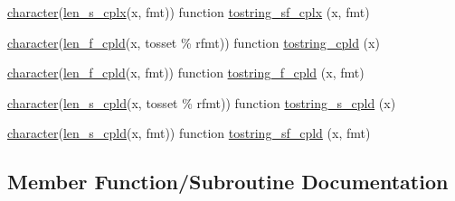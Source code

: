 \begin{DoxyCompactItemize}
\item 
\hyperlink{option__stopwatch_83_8txt_abd4b21fbbd175834027b5224bfe97e66}{character}(\hyperlink{namespacem__display_a7b573fb0cba7c7c954a820cdfe1c7968}{len\+\_\+s\+\_\+cplx}(x, fmt)) function \hyperlink{interfacem__display_1_1tostring_ac01ed8027512191049535c16d79cecc7}{tostring\+\_\+sf\+\_\+cplx} (x, fmt)
\item 
\hyperlink{option__stopwatch_83_8txt_abd4b21fbbd175834027b5224bfe97e66}{character}(\hyperlink{namespacem__display_a803611d2a793f2a4aa7563b6c8295cb3}{len\+\_\+f\+\_\+cpld}(x, tosset \% rfmt)) function \hyperlink{interfacem__display_1_1tostring_ab87f60495cf77f8e5f0fa606619a690c}{tostring\+\_\+cpld} (x)
\item 
\hyperlink{option__stopwatch_83_8txt_abd4b21fbbd175834027b5224bfe97e66}{character}(\hyperlink{namespacem__display_a803611d2a793f2a4aa7563b6c8295cb3}{len\+\_\+f\+\_\+cpld}(x, fmt)) function \hyperlink{interfacem__display_1_1tostring_a5845ff897cb6f8aca3898afddd1b1e9a}{tostring\+\_\+f\+\_\+cpld} (x, fmt)
\item 
\hyperlink{option__stopwatch_83_8txt_abd4b21fbbd175834027b5224bfe97e66}{character}(\hyperlink{namespacem__display_ace35690c2f36e28f07336cc7dcff47f4}{len\+\_\+s\+\_\+cpld}(x, tosset \% rfmt)) function \hyperlink{interfacem__display_1_1tostring_a7c94acef6337ca15a858a4b1cfc1bd4e}{tostring\+\_\+s\+\_\+cpld} (x)
\item 
\hyperlink{option__stopwatch_83_8txt_abd4b21fbbd175834027b5224bfe97e66}{character}(\hyperlink{namespacem__display_ace35690c2f36e28f07336cc7dcff47f4}{len\+\_\+s\+\_\+cpld}(x, fmt)) function \hyperlink{interfacem__display_1_1tostring_abca9920dacaf1ab1e0ad0787e13db02c}{tostring\+\_\+sf\+\_\+cpld} (x, fmt)
\end{DoxyCompactItemize}


\subsection{Member Function/\+Subroutine Documentation}
\mbox{\label{interfacem__display_1_1tostring_ab87f60495cf77f8e5f0fa606619a690c}} 
